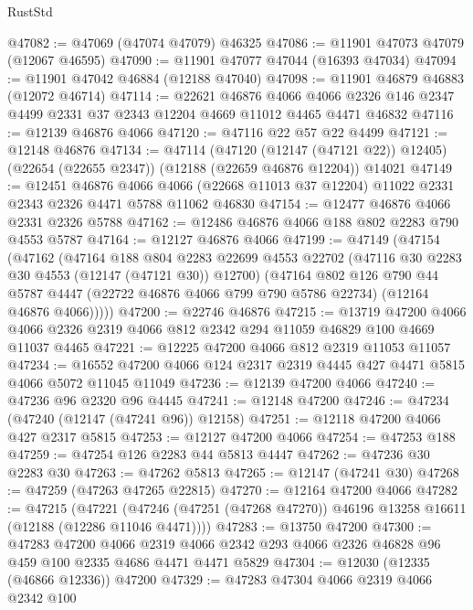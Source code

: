\begin{lexlean}{RustStd}
\begin{coremodule}
@47082 := @47069 (@47074 @47079) @46325
@47086 := @11901 @47073 @47079 (@12067 @46595)
@47090 := @11901 @47077 @47044 (@16393 @47034)
@47094 := @11901 @47042 @46884 (@12188 @47040)
@47098 := @11901 @46879 @46883 (@12072 @46714)
@47114 := @22621
    @46876
    @4066
    @4066
    @2326
    @146
    @2347
    @4499
    @2331
    @37
    @2343
    @12204
    @4669
    @11012
    @4465
    @4471
    @46832
@47116 := @12139 @46876 @4066
@47120 := @47116 @22 @57 @22 @4499
@47121 := @12148 @46876
@47134 := @47114
    (@47120 (@12147 (@47121 @22)) @12405)
    (@22654 (@22655 @2347))
    (@12188 (@22659 @46876 @12204))
    @14021
@47149 := @12451
    @46876
    @4066
    @4066
    (@22668 @11013 @37 @12204)
    @11022
    @2331
    @2343
    @2326
    @4471
    @5788
    @11062
    @46830
@47154 := @12477 @46876 @4066 @2331 @2326 @5788
@47162 := @12486 @46876 @4066 @188 @802 @2283 @790 @4553 @5787
@47164 := @12127 @46876 @4066
@47199 := @47149
    (@47154
      (@47162
        (@47164
          @188
          @804
          @2283
          @22699
          @4553
          @22702
          (@47116 @30 @2283 @30 @4553 (@12147 (@47121 @30)) @12700)
          (@47164
            @802
            @126
            @790
            @44
            @5787
            @4447
            (@22722 @46876 @4066 @799 @790 @5786 @22734)
            (@12164 @46876 @4066)))))
@47200 := @22746 @46876
@47215 := @13719
    @47200
    @4066
    @4066
    @2326
    @2319
    @4066
    @812
    @2342
    @294
    @11059
    @46829
    @100
    @4669
    @11037
    @4465
@47221 := @12225 @47200 @4066 @812 @2319 @11053 @11057
@47234 := @16552 @47200 @4066 @124 @2317 @2319 @4445 @427 @4471 @5815 @4066 @5072 @11045 @11049
@47236 := @12139 @47200 @4066
@47240 := @47236 @96 @2320 @96 @4445
@47241 := @12148 @47200
@47246 := @47234 (@47240 (@12147 (@47241 @96)) @12158)
@47251 := @12118 @47200 @4066 @427 @2317 @5815
@47253 := @12127 @47200 @4066
@47254 := @47253 @188
@47259 := @47254 @126 @2283 @44 @5813 @4447
@47262 := @47236 @30 @2283 @30
@47263 := @47262 @5813
@47265 := @12147 (@47241 @30)
@47268 := @47259 (@47263 @47265 @22815)
@47270 := @12164 @47200 @4066
@47282 := @47215
    (@47221 (@47246 (@47251 (@47268 @47270)) @46196 @13258 @16611 (@12188 (@12286 @11046 @4471))))
@47283 := @13750 @47200
@47300 := @47283
    @47200
    @4066
    @2319
    @4066
    @2342
    @293
    @4066
    @2326
    @46828
    @96
    @459
    @100
    @2335
    @4686
    @4471
    @4471
    @5829
@47304 := @12030 (@12335 (@46866 @12336)) @47200
@47329 := @47283
    @47304
    @4066
    @2319
    @4066
    @2342
    @100

\end{coremodule}
\end{lexlean}
